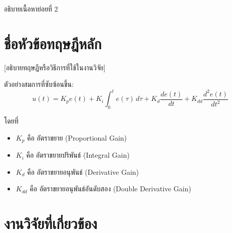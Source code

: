 \noindent\hspace{\parindent}%
อธิบายเนื้อหาย่อยที่ 2

\section{ชื่อหัวข้อทฤษฎีหลัก}

\noindent\hspace{\parindent}%
[อธิบายทฤษฎีหรือวิธีการที่ใช้ในงานวิจัย]

ตัวอย่างสมการที่ซับซ้อนขึ้น:
\begin{equation}
  u(t) = K_p e(t) + K_i \int_0^t e(\tau)\,d\tau + K_d \frac{de(t)}{dt} + K_{dd} \frac{d^2e(t)}{dt^2}
  \label{eq:pidd}
\end{equation}

โดยที่
\begin{itemize}
  \item $K_p$ คือ อัตราขยาย (Proportional Gain)
  \item $K_i$ คือ อัตราขยายปริพันธ์ (Integral Gain)
  \item $K_d$ คือ อัตราขยายอนุพันธ์ (Derivative Gain)
  \item $K_{dd}$ คือ อัตราขยายอนุพันธ์อันดับสอง (Double Derivative Gain)
\end{itemize}

\section{งานวิจัยที่เกี่ยวข้อง}

